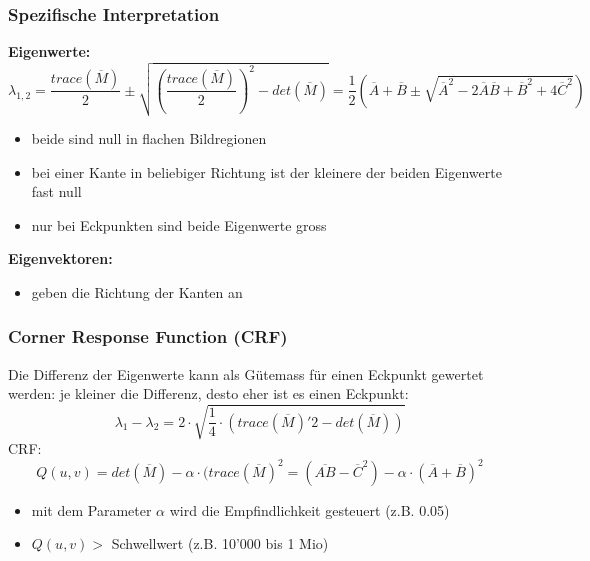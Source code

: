 \documentclass[10pt]{article}
\begin{document}
\subsubsection{Spezifische Interpretation}
\textbf{Eigenwerte:}
\begin{equation*}
	\lambda_{1,2} = \frac{trace(\overline{M})}{2} \pm \sqrt{\left( \frac{trace(\overline{M})}{2} \right)^2 - det(\overline{M})} = \frac{1}{2} \left( \overline{A} + \overline{B} \pm \sqrt{\overline{A}^2 - 2 \overline{A} \overline{B} + \overline{B}^2 + 4 \overline{C}^2} \right)
\end{equation*}
\begin{itemize}
	\item beide sind null in flachen Bildregionen
	\item bei einer Kante in beliebiger Richtung ist der kleinere der beiden Eigenwerte fast null
	\item nur bei Eckpunkten sind beide Eigenwerte gross
\end{itemize}
\textbf{Eigenvektoren:}
\begin{itemize}
	\item geben die Richtung der Kanten an
\end{itemize}
\subsubsection{Corner Response Function (CRF)}
Die Differenz der Eigenwerte kann als Gütemass für einen Eckpunkt gewertet werden: je kleiner die Differenz, desto eher ist es einen Eckpunkt:
\begin{equation*}
	\lambda_1 - \lambda_2 = 2 \cdot \sqrt{\frac{1}{4} \cdot \left( trace(\overline{M})'2 - det(\overline{M}) \right)}
\end{equation*}
CRF:
\begin{equation*}
	Q(u,v) = det(\overline{M}) - \alpha \cdot (trace(\overline{M})^2 = (\overline{AB} - \overline{C}^2) - \alpha \cdot (\overline{A} + \overline{B})^2
\end{equation*}
\begin{itemize}
	\item mit dem Parameter $\alpha$ wird die Empfindlichkeit gesteuert (z.B. 0.05)
	\item $Q(u,v) >$ Schwellwert (z.B. 10'000 bis 1 Mio)
\end{itemize}
\end{document}
